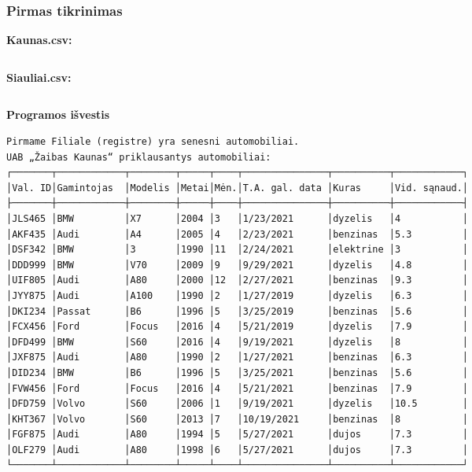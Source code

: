 \documentclass{article}
\begin{document}
\subsubsection{Pirmas tikrinimas}
\begin{changemargin}{0cm}{0cm}
    \textbf{Kaunas.csv:}
\end{changemargin}

\inputminted{csharp}{Assets/L3/test1-input1.txt}

\begin{changemargin}{0cm}{0cm}
    \textbf{Siauliai.csv:}
\end{changemargin}

\inputminted{csharp}{Assets/L3/test1-input2.txt}

\textbf{Programos išvestis}

\footnotesize
\begin{verbatim}
Pirmame Filiale (registre) yra senesni automobiliai.
UAB „Žaibas Kaunas“ priklausantys automobiliai:
┌───────┬────────────┬────────┬─────┬────┬───────────────┬──────────┬────────────┐
│Val. ID│Gamintojas  │Modelis │Metai│Mėn.│T.A. gal. data │Kuras     │Vid. sąnaud.│
├───────┼────────────┼────────┼─────┼────┼───────────────┼──────────┼────────────┤
│JLS465 │BMW         │X7      │2004 │3   │1/23/2021      │dyzelis   │4           │
│AKF435 │Audi        │A4      │2005 │4   │2/23/2021      │benzinas  │5.3         │
│DSF342 │BMW         │3       │1990 │11  │2/24/2021      │elektrine │3           │
│DDD999 │BMW         │V70     │2009 │9   │9/29/2021      │dyzelis   │4.8         │
│UIF805 │Audi        │A80     │2000 │12  │2/27/2021      │benzinas  │9.3         │
│JYY875 │Audi        │A100    │1990 │2   │1/27/2019      │dyzelis   │6.3         │
│DKI234 │Passat      │B6      │1996 │5   │3/25/2019      │benzinas  │5.6         │
│FCX456 │Ford        │Focus   │2016 │4   │5/21/2019      │dyzelis   │7.9         │
│DFD499 │BMW         │S60     │2016 │4   │9/19/2021      │dyzelis   │8           │
│JXF875 │Audi        │A80     │1990 │2   │1/27/2021      │benzinas  │6.3         │
│DID234 │BMW         │B6      │1996 │5   │3/25/2021      │benzinas  │5.6         │
│FVW456 │Ford        │Focus   │2016 │4   │5/21/2021      │benzinas  │7.9         │
│DFD759 │Volvo       │S60     │2006 │1   │9/19/2021      │dyzelis   │10.5        │
│KHT367 │Volvo       │S60     │2013 │7   │10/19/2021     │benzinas  │8           │
│FGF875 │Audi        │A80     │1994 │5   │5/27/2021      │dujos     │7.3         │
│OLF279 │Audi        │A80     │1998 │6   │5/27/2021      │dujos     │7.3         │
└───────┴────────────┴────────┴─────┴────┴───────────────┴──────────┴────────────┘


\end{verbatim}
\end{document}
